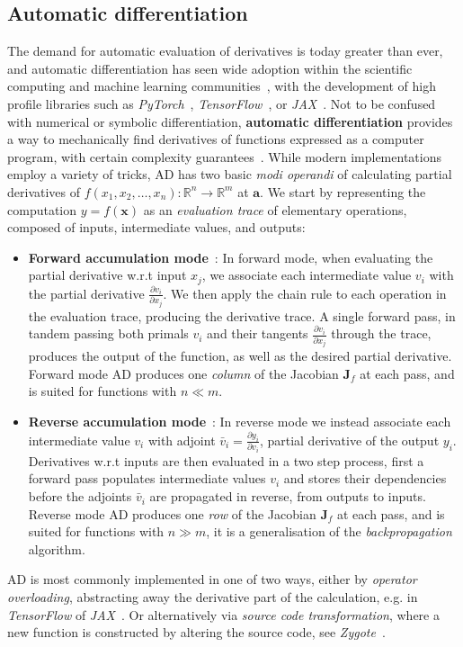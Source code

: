 \subsection{Automatic differentiation}
\label{subsec:autodiff}
The demand for automatic evaluation of derivatives is today greater than ever, and automatic differentiation has seen wide adoption within the scientific computing and machine learning communities~\cite{lyu2013automatic, tamayo2018automatic, baydin2018automatic}, with the development of high profile libraries such as \emph{PyTorch}~\cite{paszke2017automatic}, \emph{TensorFlow}~\cite{abadi2016tensorflow}, or \emph{JAX}~\cite{jax2018github}. Not to be confused with numerical or symbolic differentiation, \textbf{automatic differentiation} provides a way to mechanically find derivatives of functions expressed as a computer program, with certain complexity guarantees~\cite{barak2016history}. While modern implementations employ a variety of tricks, AD has two basic \emph{modi operandi} of calculating partial derivatives of $f(x_1, x_2, \ldots, x_n): \mathbb{R}^n \rightarrow \mathbb{R}^m$ at $\mathbf{a}$. We start by representing the computation $y = f(\mathbf{x})$ as an \emph{evaluation trace} of elementary operations, composed of inputs, intermediate values, and outputs:
\begin{itemize}
	\item \textbf{Forward accumulation mode}~\cite{wengert1964simple}:  In forward mode, when evaluating the partial derivative w.r.t input $x_j$, we associate each intermediate value $v_i$ with the partial derivative $\frac{\partial v_i}{\partial x_j}$. We then apply the chain rule to each operation in the evaluation trace, producing the derivative trace. A single forward pass, in tandem passing both primals $v_i$ and their tangents $\frac{\partial v_i}{\partial x_j}$ through the trace, produces the output of the function, as well as the desired partial derivative. Forward mode AD produces one \emph{column} of the Jacobian $\textbf{J}_f$ at each pass, and is suited for functions with $n \ll m$.
	
	\item \textbf{Reverse accumulation mode}~\cite{speelpenning1980compiling}: In reverse mode we instead associate each intermediate value $v_i$ with adjoint $\bar{v}_i = \frac{\partial y_i}{\partial v_i}$, partial derivative of the output $y_i$. Derivatives w.r.t inputs are then evaluated in a two step process, first a forward pass populates intermediate values $v_i$ and stores their dependencies before the adjoints $\bar{v}_i$ are propagated in reverse, from outputs to inputs. Reverse mode AD produces one \emph{row} of the Jacobian $\textbf{J}_f$ at each pass, and is suited for functions with $n \gg m$, it is a generalisation of the \emph{backpropagation} algorithm.
\end{itemize}
AD is most commonly implemented in one of two ways, either by \emph{operator overloading}, abstracting away the derivative part of the calculation, e.g. in \emph{TensorFlow} of \emph{JAX}~\cite{abadi2016tensorflow, jax2018github}. Or alternatively via \emph{source code transformation}, where a new function is constructed by altering the source code, see \emph{Zygote}~\cite{innes2018don}.

